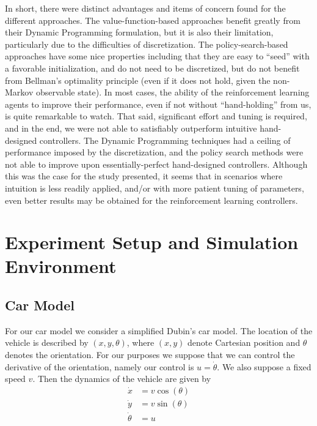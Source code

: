 \documentclass{article}
\begin{document}
In short, there were distinct advantages and items of concern found for the different approaches.    The value-function-based approaches benefit greatly from their Dynamic Programming formulation, but it is also their limitation, particularly due to the difficulties of discretization.  The policy-search-based approaches have some nice properties including that they are easy to ``seed'' with a favorable initialization, and do not need to be discretized, but do not benefit from Bellman's optimality principle (even if it does not hold, given the non-Markov observable state).  In most cases, the ability of the reinforcement learning agents to improve their performance, even if not without ``hand-holding'' from us, is quite remarkable to watch.  That said, significant effort and tuning is required, and in the end, we were not able to satisfiably outperform intuitive hand-designed controllers.  The Dynamic Programming techniques had a ceiling of performance imposed by the discretization, and the policy search methods were not able to improve upon essentially-perfect hand-designed controllers.  Although this was the case for the study presented, it seems that in scenarios where intuition is less readily applied, and/or with more patient tuning of parameters, even better results may be obtained for the reinforcement learning controllers.

\section{Experiment Setup and Simulation Environment}

\subsection{Car Model}

For our car model we consider a simplified Dubin's car model. The location of the vehicle is described by $(x,y,\theta)$, where $(x,y)$ denote Cartesian position and $\theta$ denotes the orientation. For our purposes we suppose that we can control the derivative of the orientation, namely our control is $u = \dot{\theta}$. We also suppose a fixed speed $v$. Then the dynamics of the vehicle are given by
%
%
\begin{align}
\dot{x} &= v \cos(\theta) \\ 
\dot{y} &= v \sin(\theta)\\ 
\dot{\theta} &= u
\end{align}
%
%
%
\end{document}
